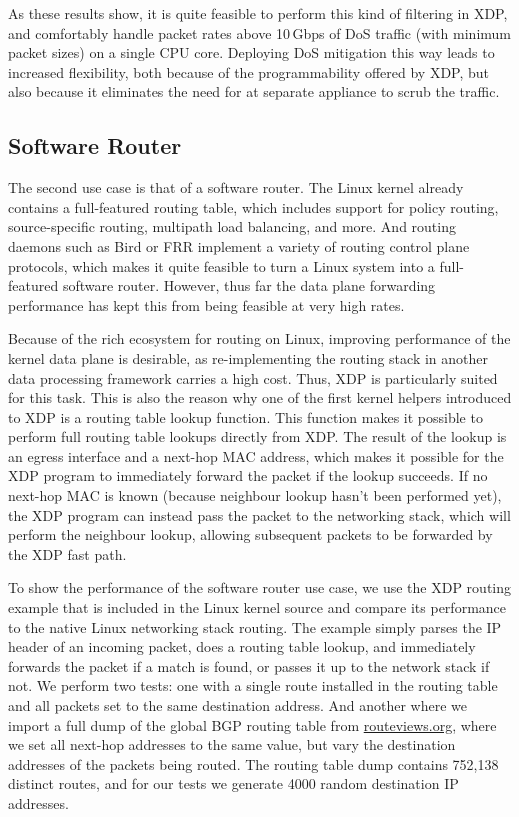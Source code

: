 \documentclass[10pt,sigconf]{acmart}
\begin{document}
As these results show, it is quite feasible to perform this kind of filtering in
XDP, and comfortably handle packet rates above 10\,Gbps of DoS traffic (with
minimum packet sizes) on a single CPU core. Deploying DoS mitigation this way
leads to increased flexibility, both because of the programmability offered by
XDP, but also because it eliminates the need for at separate appliance to scrub
the traffic.

\subsection{Software Router}
\label{sec:fwd-usecase}
The second use case is that of a software router. The Linux kernel already
contains a full-featured routing table, which includes support for policy
routing, source-specific routing, multipath load balancing, and more. And
routing daemons such as Bird or FRR implement a variety of routing control
plane protocols, which makes it quite feasible to turn a Linux system into a
full-featured software router. However, thus far the data plane forwarding
performance has kept this from being feasible at very high rates.

Because of the rich ecosystem for routing on Linux, improving performance of the
kernel data plane is desirable, as re-implementing the routing stack in another
data processing framework carries a high cost. Thus, XDP is particularly suited
for this task. This is also the reason why one of the first kernel helpers
introduced to XDP is a routing table lookup function. This function makes it
possible to perform full routing table lookups directly from XDP. The result of
the lookup is an egress interface and a next-hop MAC address, which makes it
possible for the XDP program to immediately forward the packet if the lookup
succeeds. If no next-hop MAC is known (because neighbour lookup hasn't been
performed yet), the XDP program can instead pass the packet to the networking
stack, which will perform the neighbour lookup, allowing subsequent packets to
be forwarded by the XDP fast path.

To show the performance of the software router use case, we use the XDP routing
example that is included in the Linux kernel source and compare its performance
to the native Linux networking stack routing. The example simply parses the IP
header of an incoming packet, does a routing table lookup, and immediately
forwards the packet if a match is found, or passes it up to the network stack if
not. We perform two tests: one with a single route installed in the routing
table and all packets set to the same destination address. And another where we
import a full dump of the global BGP routing table from \url{routeviews.org},
where we set all next-hop addresses to the same value, but vary the destination
addresses of the packets being routed. The routing table dump contains 752,138
distinct routes, and for our tests we generate 4000 random destination IP
addresses.
\end{document}
